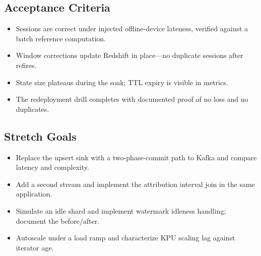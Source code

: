 \subsection*{Acceptance Criteria}
\begin{itemize}
    \item Sessions are correct under injected offline-device lateness, verified against a batch reference computation.
    \item Window corrections update Redshift in place---no duplicate sessions after refires.
    \item State size plateaus during the soak; TTL expiry is visible in metrics.
    \item The redeployment drill completes with documented proof of no loss and no duplicates.
\end{itemize}

\subsection*{Stretch Goals}
\begin{itemize}
    \item Replace the upsert sink with a two-phase-commit path to Kafka and compare latency and complexity.
    \item Add a second stream and implement the attribution interval join in the same application.
    \item Simulate an idle shard and implement watermark idleness handling; document the before/after.
    \item Autoscale under a load ramp and characterize KPU scaling lag against iterator age.
\end{itemize}
